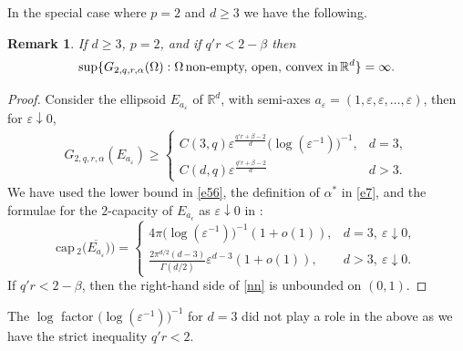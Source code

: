 \documentclass[a4paper,9pt]{article}
\newcommand{\ds}{\displaystyle}
\newcommand{\R}{\mathbb{R}}
\newtheorem{remark} {Remark}
\def\cp{\mathrm{cap}\,}
\newcommand{\Om}{\Omega}
\newcommand{\vps}{\varepsilon}
\begin{document}
In the special case where $p=2$ and $d\ge 3$ we have the following.
\begin{remark}\label{rem3}
If $d\ge 3$, $p=2$, and if $q'r<2-\beta$ then
\begin{equation*}
\sup \{G_{2,q,r,\alpha}(\Om): \Om\, \textup{non-empty, open, convex in}\,\R^d \}=\infty.
\end{equation*}
\end{remark}
\begin{proof}
Consider the ellipsoid $E_{a_\varepsilon}$ of $\R^d$, with semi-axes $a_{\varepsilon}=(1,\varepsilon, \varepsilon,\ldots,\varepsilon)$, then for $\varepsilon\downarrow 0$,
\begin{align}\label{nn}
G_{2,q,r,\alpha}(E_{a_\varepsilon}) \ge \begin{cases}  C(3,q)  \varepsilon^{\frac{q'r+\beta-2}{d}}\big(\log(\varepsilon^{-1})\big)^{-1},&d=3,\\
C(d,q) \varepsilon^{\frac{q'r+\beta-2}{d}} &d>3.
\end{cases}
\end{align}
We have used the lower bound in \eqref{e56}, the definition of $\alpha^*$ in \eqref{e7}, and the formulae for the $2$-capacity of $E_{a_\epsilon}$ as $\varepsilon\downarrow 0$ in \cite[p.260]{IMcK}:
\begin{equation*}%
\cp_2\big(\overline{E_{a_\vps}})\big)=\begin{cases}4\pi\big(\log(\varepsilon^{-1})\big)^{-1}(1+o(1)),&d=3,\ \varepsilon\downarrow0,\\
\ds\frac{2\pi^{d/2}(d-3)}{\Gamma(d/2)}\varepsilon^{d-3}(1+o(1)),&d>3,\ \varepsilon\downarrow0.
\end{cases}
\end{equation*}
If $q'r<2-\beta$, then the right-hand side of \eqref{nn} is unbounded on $(0,1)$.
\end{proof}
The $\log$ factor $\big(\log(\varepsilon^{-1})\big)^{-1}$ for $d=3$ did not play a role in the above as we have the strict inequality $q'r<2$.

\smallskip
\end{document}
